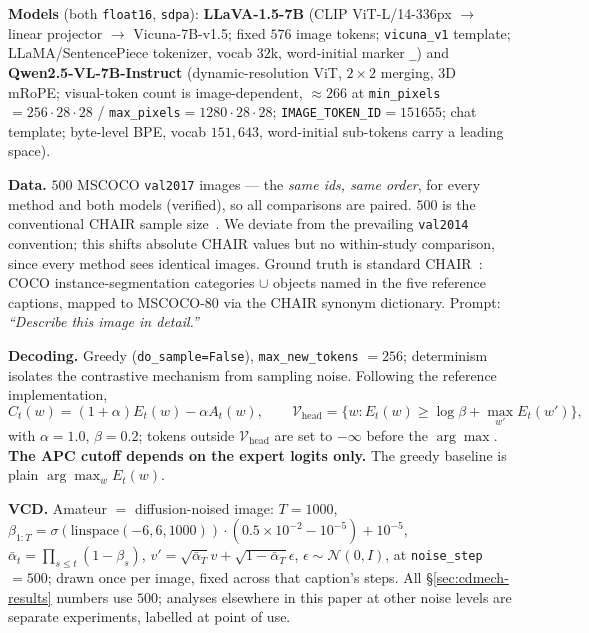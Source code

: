 \documentclass{article}
\begin{document}
\textbf{Models} (both \texttt{float16}, \texttt{sdpa}): \textbf{LLaVA-1.5-7B}
(CLIP ViT-L/14-336px $\to$ linear projector $\to$ Vicuna-7B-v1.5; fixed $576$
image tokens; \texttt{vicuna\_v1} template; LLaMA/SentencePiece tokenizer, vocab
$32$k, word-initial marker \texttt{\_}) and \textbf{Qwen2.5-VL-7B-Instruct}
(dynamic-resolution ViT, $2\times2$ merging, 3D mRoPE; visual-token count is
image-dependent, $\approx266$ at \texttt{min\_pixels}$=256\cdot28\cdot28$ /
\texttt{max\_pixels}$=1280\cdot28\cdot28$; \texttt{IMAGE\_TOKEN\_ID}$=151655$;
chat template; byte-level BPE, vocab $151{,}643$, word-initial sub-tokens carry
a leading space).

\textbf{Data.} $500$ MSCOCO \texttt{val2017} images --- the \emph{same ids, same
order}, for every method and both models (verified), so all comparisons are
paired. $500$ is the conventional CHAIR sample size~\citep{huang2024opera}. We
deviate from the prevailing \texttt{val2014} convention; this shifts absolute
CHAIR values but no within-study comparison, since every method sees identical
images. Ground truth is standard CHAIR~\citep{rohrbach2018chair}: COCO
instance-segmentation categories $\cup$ objects named in the five reference
captions, mapped to MSCOCO-80 via the CHAIR synonym dictionary. Prompt:
\emph{``Describe this image in detail.''}

\textbf{Decoding.} Greedy (\texttt{do\_sample=False}), \texttt{max\_new\_tokens}
$=256$; determinism isolates the contrastive mechanism from sampling noise.
Following the reference implementation,
\begin{equation}
  C_t(w) = (1+\alpha)E_t(w) - \alpha A_t(w),
  \qquad
  \mathcal{V}_{\text{head}} = \big\{ w : E_t(w) \ge \log\beta + \max_{w'} E_t(w') \big\},
\end{equation}
with $\alpha=1.0$, $\beta=0.2$; tokens outside $\mathcal{V}_{\text{head}}$ are
set to $-\infty$ before the $\arg\max$. \textbf{The APC cutoff depends on the
expert logits only.} The greedy baseline is plain $\arg\max_w E_t(w)$.

\textbf{VCD.} Amateur $=$ diffusion-noised image: $T=1000$,
$\beta_{1:T}=\sigma(\mathrm{linspace}(-6,6,1000))\cdot(0.5\!\times\!10^{-2}-10^{-5})+10^{-5}$,
$\bar\alpha_t=\prod_{s\le t}(1-\beta_s)$,
$v'=\sqrt{\bar\alpha_T}v+\sqrt{1-\bar\alpha_T}\epsilon$, $\epsilon\sim\mathcal{N}(0,I)$,
at \texttt{noise\_step}$=500$; drawn once per image, fixed across that caption's
steps. All \S\ref{sec:cdmech-results} numbers use $500$; analyses elsewhere in this
paper at other noise levels are separate experiments, labelled at point of use.
\end{document}
